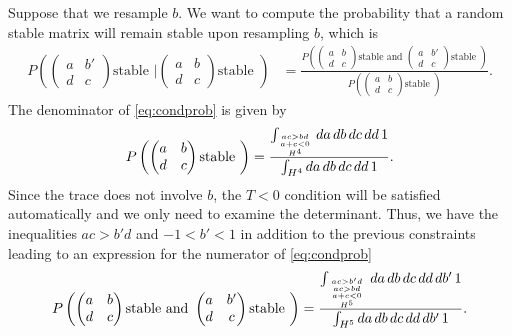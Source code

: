 Suppose that we resample $b$.  We want to compute the probability that a random stable matrix will remain stable upon resampling $b$, which is
\begin{align}\label{eq:condprob}
P\left(\begin{pmatrix}
a & b' \\
d & c
\end{pmatrix} \textrm{stable } \bigg| \begin{pmatrix}
a & b \\
d & c
\end{pmatrix} \textrm{stable } \right)
& = \frac{P\left(\begin{pmatrix}
a & b \\
d & c
\end{pmatrix} \textrm{stable and } \begin{pmatrix}
a & b' \\
d & c
\end{pmatrix} \textrm{stable } \right)}{P\left(\begin{pmatrix}
a & b \\
d & c
\end{pmatrix} \textrm{stable } \right)}.
\end{align}
The denominator of \ref{eq:condprob} is given by
\begin{align*}
P\left(\begin{pmatrix}
a & b \\
d & c
\end{pmatrix} \textrm{stable } \right) = \frac{\int_{\genfrac{}{}{0pt}{}{\genfrac{}{}{0pt}{}{ac>bd}{a+c<0}}{H^4}} da\,db\,dc\,dd\,1}{\int_{H^4} da\,db\,dc\,dd\,1}.
\end{align*}
Since the trace does not involve $b$, the $T<0$ condition will be satisfied automatically and we only need to examine the determinant. Thus, we have the inequalities $ac > b'd$ and $-1 < b' < 1$ in addition to the previous constraints leading to an expression for the numerator of \ref{eq:condprob}
\begin{align*}
P\left(\begin{pmatrix}
a & b \\
d & c
\end{pmatrix} \textrm{stable and } \begin{pmatrix}
a & b' \\
d & c
\end{pmatrix} \textrm{stable } \right) = \frac{\int_{{{ac>b'd \atop ac>bd} \atop a+c<0} \atop H^5} da\,db\,dc\,dd\,db'\,1}{\int_{H^5} da\,db\,dc\,dd\,db'\,1}.
\end{align*}
